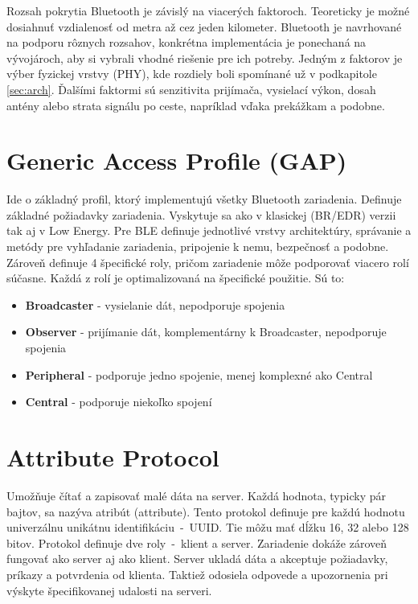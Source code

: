 Rozsah pokrytia Bluetooth je závislý na viacerých faktoroch. Teoreticky je možné dosiahnuť vzdialenosť od metra až cez jeden kilometer. Bluetooth je navrhované na podporu rôznych rozsahov, konkrétna implementácia je ponechaná na vývojároch, aby si vybrali vhodné riešenie pre ich potreby. Jedným z faktorov je výber fyzickej vrstvy (PHY), kde rozdiely boli spomínané už v podkapitole \ref{sec:arch}. Ďalšími faktormi sú senzitivita prijímača, vysielací výkon, dosah antény alebo strata signálu po ceste, napríklad vďaka prekážkam a podobne.\cite{bluetooth}

\section{Generic Access Profile (GAP)}\label{sec:gap}

Ide o základný profil, ktorý implementujú všetky Bluetooth zariadenia. Definuje základné požiadavky zariadenia. Vyskytuje sa ako v klasickej (BR/EDR) verzii tak aj v Low Energy. Pre BLE definuje jednotlivé vrstvy architektúry, správanie a metódy pre vyhľadanie zariadenia, pripojenie k nemu, bezpečnosť a podobne.
Zároveň definuje 4 špecifické roly, pričom zariadenie môže podporovať viacero rolí súčasne. Každá z rolí je optimalizovaná na špecifické použitie. Sú to:
\begin{itemize}
    \item \textbf{Broadcaster} - vysielanie dát, nepodporuje spojenia
    \item \textbf{Observer} - prijímanie dát, komplementárny k Broadcaster, nepodporuje spojenia
    \item \textbf{Peripheral} - podporuje jedno spojenie, menej komplexné ako Central
    \item \textbf{Central} - podporuje niekoľko spojení\cite{bluetooth}
\end{itemize}

\section{Attribute Protocol}

Umožňuje čítať a zapisovať malé dáta na server. Každá hodnota, typicky pár bajtov, sa nazýva atribút (attribute). Tento protokol definuje pre každú hodnotu univerzálnu unikátnu identifikáciu~-~UUID. Tie môžu mať dĺžku 16, 32 alebo 128 bitov.
Protokol definuje dve roly~-~klient a server. Zariadenie dokáže zároveň fungovať ako server aj ako klient. Server ukladá dáta a akceptuje požiadavky, príkazy a potvrdenia od klienta. Taktiež odosiela odpovede a upozornenia pri výskyte špecifikovanej udalosti na serveri.\cite{bluetooth}

